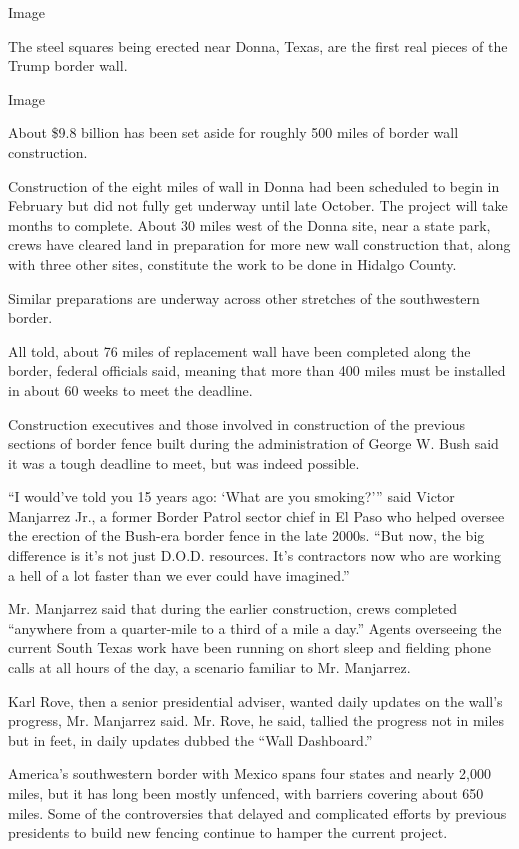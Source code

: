 Image

The steel squares being erected near Donna, Texas, are the first real
pieces of the Trump border wall.

Image

About \$9.8 billion has been set aside for roughly 500 miles of border
wall construction.

Construction of the eight miles of wall in Donna had been scheduled to
begin in February but did not fully get underway until late October. The
project will take months to complete. About 30 miles west of the Donna
site, near a state park, crews have cleared land in preparation for more
new wall construction that, along with three other sites, constitute the
work to be done in Hidalgo County.

Similar preparations are underway across other stretches of the
southwestern border.

All told, about 76 miles of replacement wall have been completed along
the border, federal officials said, meaning that more than 400 miles
must be installed in about 60 weeks to meet the deadline.

Construction executives and those involved in construction of the
previous sections of border fence built during the administration of
George W. Bush said it was a tough deadline to meet, but was indeed
possible.

``I would've told you 15 years ago: `What are you smoking?''' said
Victor Manjarrez Jr., a former Border Patrol sector chief in El Paso who
helped oversee the erection of the Bush-era border fence in the late
2000s. ``But now, the big difference is it's not just D.O.D. resources.
It's contractors now who are working a hell of a lot faster than we ever
could have imagined.''

Mr. Manjarrez said that during the earlier construction, crews completed
``anywhere from a quarter-mile to a third of a mile a day.'' Agents
overseeing the current South Texas work have been running on short sleep
and fielding phone calls at all hours of the day, a scenario familiar to
Mr. Manjarrez.

Karl Rove, then a senior presidential adviser, wanted daily updates on
the wall's progress, Mr. Manjarrez said. Mr. Rove, he said, tallied the
progress not in miles but in feet, in daily updates dubbed the ``Wall
Dashboard.''

America's southwestern border with Mexico spans four states and nearly
2,000 miles, but it has long been mostly unfenced, with barriers
covering about 650 miles. Some of the controversies that delayed and
complicated efforts by previous presidents to build new fencing continue
to hamper the current project.

